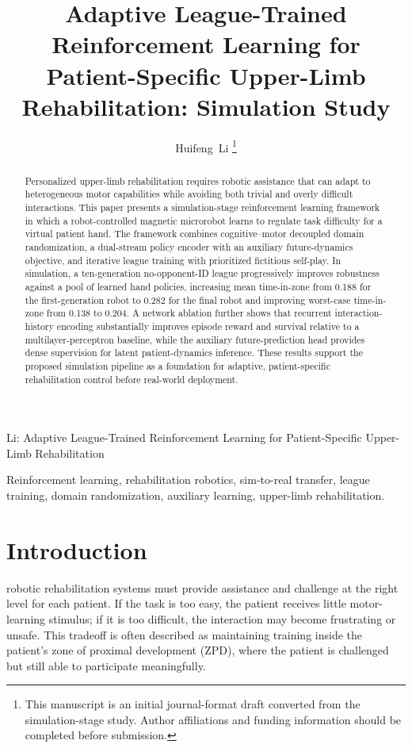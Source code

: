 \documentclass[lettersize,journal]{IEEEtran}
\begin{document}
\title{Adaptive League-Trained Reinforcement Learning for Patient-Specific Upper-Limb Rehabilitation: Simulation Study}

\author{Huifeng~Li
\thanks{This manuscript is an initial journal-format draft converted from the simulation-stage study. Author affiliations and funding information should be completed before submission.}}

%
{Li: Adaptive League-Trained Reinforcement Learning for Patient-Specific Upper-Limb Rehabilitation}

\maketitle

\begin{abstract}
Personalized upper-limb rehabilitation requires robotic assistance that can adapt to heterogeneous motor capabilities while avoiding both trivial and overly difficult interactions. This paper presents a simulation-stage reinforcement learning framework in which a robot-controlled magnetic microrobot learns to regulate task difficulty for a virtual patient hand. The framework combines cognitive--motor decoupled domain randomization, a dual-stream policy encoder with an auxiliary future-dynamics objective, and iterative league training with prioritized fictitious self-play. In simulation, a ten-generation no-opponent-ID league progressively improves robustness against a pool of learned hand policies, increasing mean time-in-zone from 0.188 for the first-generation robot to 0.282 for the final robot and improving worst-case time-in-zone from 0.138 to 0.204. A network ablation further shows that recurrent interaction-history encoding substantially improves episode reward and survival relative to a multilayer-perceptron baseline, while the auxiliary future-prediction head provides dense supervision for latent patient-dynamics inference. These results support the proposed simulation pipeline as a foundation for adaptive, patient-specific rehabilitation control before real-world deployment.
\end{abstract}

\begin{IEEEkeywords}
Reinforcement learning, rehabilitation robotics, sim-to-real transfer, league training, domain randomization, auxiliary learning, upper-limb rehabilitation.
\end{IEEEkeywords}

\section{Introduction}
 robotic rehabilitation systems must provide assistance and challenge at the right level for each patient. If the task is too easy, the patient receives little motor-learning stimulus; if it is too difficult, the interaction may become frustrating or unsafe. This tradeoff is often described as maintaining training inside the patient's zone of proximal development (ZPD), where the patient is challenged but still able to participate meaningfully.
\end{document}
